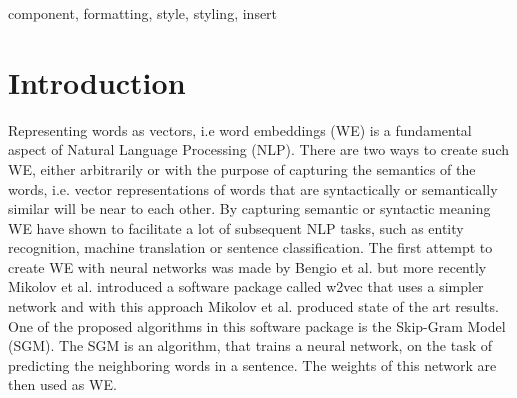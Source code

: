 \documentclass[conference]{IEEEtran}
\begin{document}
\begin{IEEEkeywords}
component, formatting, style, styling, insert
\end{IEEEkeywords}

\section{Introduction}\label{chap:introduction}

Representing words as vectors, i.e word embeddings (WE) is a fundamental aspect of Natural Language Processing (NLP). There are two ways to create such WE, either arbitrarily or with the purpose of capturing the semantics of the words, i.e. vector representations of words that are syntactically or semantically similar will be near to each other. By capturing semantic or syntactic meaning WE have shown to facilitate a lot of subsequent NLP tasks, such as entity recognition, machine translation or sentence classification.  The first attempt to create WE with neural networks was made by Bengio et al. \cite{bengio} but more recently Mikolov et al. \cite{mikolov} introduced a software package called w2vec that uses a simpler network and with this approach Mikolov et al. produced state of the art results. One of the proposed algorithms in this software package is the Skip-Gram Model (SGM). The SGM is an algorithm, that trains a neural network, on the task of predicting the neighboring words in a sentence. The weights of this network are then used as WE. 
\end{document}
